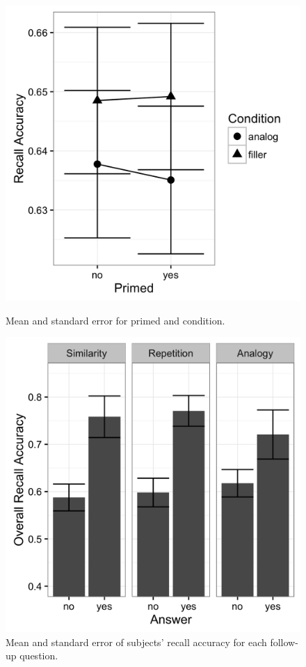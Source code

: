 \documentclass[a4paper,man,natbib,floatsintext,import]{apa6}
\begin{document}
\begin{figure}
\begin{minipage}[t]{.5\textwidth}
\includegraphics[width=.9\linewidth]{figures/main2b.png}
\caption{Mean and standard error for primed and condition.}
\label{fig:main2b}
\end{minipage}
\begin{minipage}[t]{.5\textwidth}
\includegraphics[width=.9\linewidth]{figures/fol2_answerXoverall.png}
\caption{Mean and standard error of subjects' recall accuracy for each follow-up question.}
\label{fig:fol2}
\end{minipage}
\end{figure}
\end{document}
